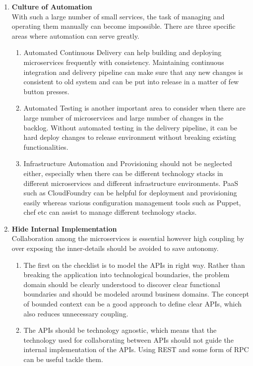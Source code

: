 \begin{enumerate}
\item \textbf{Culture of Automation}\\
With such a large number of small services, the task of managing and operating them manually can become impossible. There are three specific areas where automation can serve greatly.
\begin{enumerate}
\item Automated Continuous Delivery can help building and deploying microservices frequently with consistency. Maintaining continuous integration and delivery pipeline can make sure that any new changes is consistent to old system and can be put into release in a matter of few button presses.
\item Automated Testing is another important area to consider when there are large number of microservices and large number of changes in the backlog. Without automated testing in the delivery pipeline, it can be hard deploy changes to release environment without breaking existing functionalities.
\item Infrastructure Automation and Provisioning should not be neglected either, especially when there can be different technology stacks in different microservices and different infrastructure environments. \acrshort{PaaS} such as CloudFoundry can be helpful for deployment and provisioning easily whereas various configuration management tools such as Puppet, chef etc can assist to manage different technology stacks.
\end{enumerate}
\item \textbf{Hide Internal Implementation}\\
Collaboration among the microservices is essential however high coupling by over exposing the inner-details should be avoided to save autonomy.
\begin{enumerate}
\item The first on the checklist is to model the \acrshort{API}s in right way. Rather than breaking the application into technological boundaries, the problem domain should be clearly understood to discover clear functional boundaries and should be modeled around business domains. The concept of bounded context can be a good approach to define clear \acrshort{API}s, which also reduces unnecessary coupling.
\item The \acrshort{API}s should be technology agnostic, which means that the technology used for collaborating between \acrshort{API}s should not guide the internal implementation of the \acrshort{API}s. Using \acrshort{REST} and some form of \acrshort{RPC} can be useful tackle them.

\end{enumerate}
\end{enumerate}
